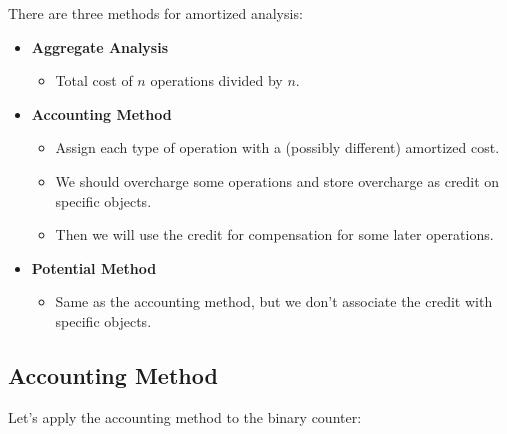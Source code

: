 \documentclass[../main/main.tex]{subfiles}
\begin{document}
There are three methods for amortized analysis: 
\begin{itemize}
	\item\textbf{ Aggregate Analysis } 
		\begin{itemize}
			\item Total cost of $n$ operations divided by $n$.
		\end{itemize}
	\item\textbf{Accounting Method}
		\begin{itemize}
			\item Assign each type of operation with a (possibly different) amortized cost.
			\item We should overcharge some operations and store overcharge as credit on specific objects. 
			\item Then we will use the credit for compensation for some later operations.
		\end{itemize}
	\item \textbf{Potential Method}
		\begin{itemize}
			\item Same as the accounting method, but we don't associate the credit with specific objects.
		\end{itemize}
\end{itemize}
\subsection{Accounting Method}
Let's apply the accounting method to the binary counter:\\
\end{document}
